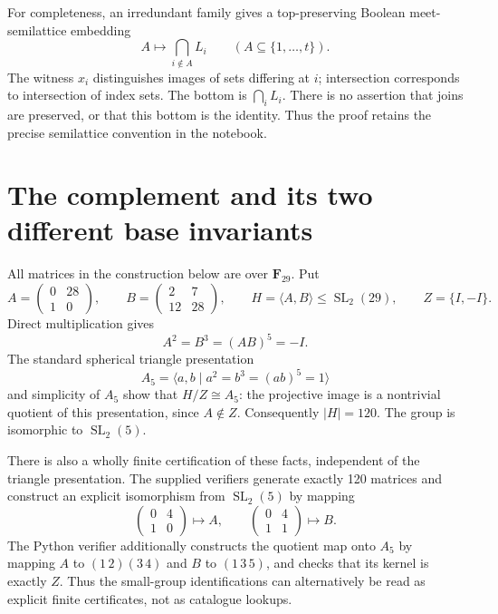 \documentclass[11pt]{article}
\theoremstyle{remark}\newtheorem{remark}[theorem]{Remark}
\newcommand{\F}{\mathbf F}
\newcommand{\SL}{\operatorname{SL}}
\begin{document}
For completeness, an irredundant family gives a top-preserving Boolean
meet-semilattice embedding
\[
 A\longmapsto\bigcap_{i\notin A}L_i\qquad(A\subseteq\{1,\ldots,t\}).
\]
The witness $x_i$ distinguishes images of sets differing at $i$; intersection
corresponds to intersection of index sets. The bottom is $\bigcap_iL_i$.
There is no assertion that joins are preserved, or that this bottom is the
identity. Thus the proof retains the precise semilattice convention in the
notebook.

\section{The complement and its two different base invariants}
All matrices in the construction below are over $\F_{29}$. Put
\[
 A=\begin{pmatrix}0&28\\1&0\end{pmatrix},\qquad
 B=\begin{pmatrix}2&7\\12&28\end{pmatrix},\qquad
 H=\langle A,B\rangle\le\SL_2(29),\qquad Z=\{I,-I\}.
\]
Direct multiplication gives
\begin{equation}\label{eq:triangle}
 A^2=B^3=(AB)^5=-I.
\end{equation}
The standard spherical triangle presentation
\[
 A_5=\langle a,b\mid a^2=b^3=(ab)^5=1\rangle
\]
and simplicity of $A_5$ show that $H/Z\cong A_5$: the projective image is a
nontrivial quotient of this presentation, since $A\notin Z$. Consequently
$|H|=120$. The group is isomorphic to $\SL_2(5)$.

There is also a wholly finite certification of these facts, independent of
the triangle presentation. The supplied verifiers generate exactly 120
matrices and construct an explicit isomorphism from $\SL_2(5)$ by mapping
\[
 \begin{pmatrix}0&4\\1&0\end{pmatrix}\longmapsto A,
 \qquad
 \begin{pmatrix}0&4\\1&1\end{pmatrix}\longmapsto B.
\]
The Python verifier additionally constructs the quotient map onto $A_5$ by
mapping $A$ to $(1\,2)(3\,4)$ and $B$ to $(1\,3\,5)$, and checks that its
kernel is exactly $Z$. Thus the small-group identifications can alternatively
be read as explicit finite certificates, not as catalogue lookups.
\end{document}
